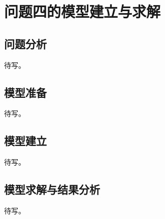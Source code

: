 \section{问题四的模型建立与求解}
\subsection{问题分析}
待写。

\subsection{模型准备}
待写。

\subsection{模型建立}
待写。

\subsection{模型求解与结果分析}
待写。
